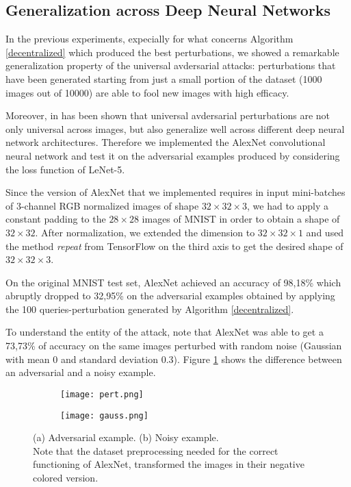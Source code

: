 \subsection{Generalization across Deep Neural Networks}
In the previous experiments, expecially for what concerns Algorithm \ref{decentralized} which produced the best perturbations, we showed a remarkable generalization property of the universal avdersarial attacks: perturbations that have been generated starting from just a small portion of the dataset (1000 images out of 10000) are able to fool new images with high efficacy.

Moreover, in \cite{A2} has been shown that universal avdersarial perturbations are not only universal across images, but also generalize well across different deep neural network architectures. Therefore we implemented the AlexNet convolutional neural network and test it on the adversarial examples produced by considering the loss function of LeNet-5.

Since the version of AlexNet that we implemented requires in input mini-batches of 3-channel RGB normalized images of shape $32\times 32\times 3$, we had to apply a constant padding to the $28\times 28$ images of MNIST in order to obtain a shape of $32\times 32$. After normalization, we extended the dimension to $32\times 32\times 1$ and used the method \textit{repeat} from TensorFlow on the third axis to get the desired shape of $32\times 32\times 3$. 

On the original MNIST test set, AlexNet achieved an accuracy of 98,18\% which abruptly dropped to 32,95\% on the adversarial examples obtained by applying the 100 queries-perturbation generated by Algorithm \ref{decentralized}.

To understand the entity of the attack, note that AlexNet was able to get a 73,73\% of accuracy on the same images perturbed with random noise (Gaussian with mean 0 and standard deviation 0.3). Figure \ref{fig:gen} shows the difference between an adversarial and a noisy example.

\begin{figure}[h]
	\centering
	\begin{subfigure}[b]{0.15\textwidth}
		\centering
		\texttt{[image: pert.png]}
		\caption{}
	\end{subfigure}
	\hspace{0.7cm}
	\begin{subfigure}[b]{0.15\textwidth}
		\texttt{[image: gauss.png]}
		\caption{}
	\end{subfigure}
	\caption{{\small (a) Adversarial example. (b) Noisy example.\\ Note that the dataset preprocessing needed for the correct functioning of AlexNet, transformed the images in their negative colored version.}}
	\label{fig:gen}
\end{figure}